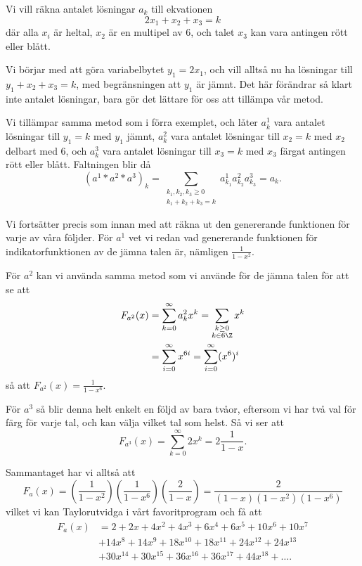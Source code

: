 \documentclass[nobib]{tufte-handout}
\begin{document}
\begin{example}
  Vi vill räkna antalet lösningar $a_k$ till ekvationen
  $$2x_1 + x_2 + x_3 = k$$
  där alla $x_i$ är heltal, $x_2$ är en multipel av $6$, och talet $x_3$ kan vara antingen rött eller blått.

  Vi börjar med att göra variabelbytet $y_1 = 2x_1$, och vill alltså nu ha lösningar till $y_1 + x_2 + x_3 = k$, med begränsningen att $y_1$ är jämnt. Det här förändrar så klart inte antalet lösningar, bara gör det lättare för oss att tillämpa vår metod.

  Vi tillämpar samma metod som i förra exemplet, och låter $a^1_k$ vara antalet lösningar till $y_1 = k$ med $y_1$ jämnt, $a^2_k$ vara antalet lösningar till $x_2 = k$ med $x_2$ delbart med $6$, och $a^3_k$ vara antalet lösningar till $x_3 = k$ med $x_3$ färgat antingen rött eller blått. Faltningen blir då 
  $$(a^1 * a^2 * a^3)_k = \sum_{\substack{k_1, k_2, k_3 \geq 0\\k_1+k_2+k_3 = k}} a^1_{k_1}a^2_{k_2}a^3_{k_3} = a_k.$$

  Vi fortsätter precis som innan med att räkna ut den genererande funktionen för varje av våra följder. För $a^1$ vet vi redan vad genererande funktionen för indikatorfunktionen av de jämna talen är, nämligen $\frac{1}{1-x^2}$. 
  
  För $a^2$ kan vi använda samma metod som vi använde för de jämna talen för att se att
  \begin{align*}
    F_{a^2}(x) &= \sum_{k=0}^{\infty} a^2_k x^k = \sum_{\substack{k \geq 0\\k \in 6\Z}} x^k\\
    &= \sum_{i=0}^{\infty} x^{6i} = \sum_{i=0}^{\infty} (x^6)^i
  \end{align*}
  så att $F_{a^2}(x) = \frac{1}{1-x^6}$.

  För $a^3$ så blir denna helt enkelt en följd av bara tvåor, eftersom vi har två val för färg för varje tal, och kan välja vilket tal som helst. Så vi ser att
  $$F_{a^3}(x) = \sum_{k=0}^{\infty} 2x^k = 2\frac{1}{1-x}.$$

  Sammantaget har vi alltså att
  $$F_a(x) = \left(\frac{1}{1-x^2}\right)\left(\frac{1}{1-x^6}\right)\left(\frac{2}{1-x}\right) = \frac{2}{(1-x)(1-x^2)(1-x^6)}$$
  vilket vi kan Taylorutvidga i vårt favoritprogram och få att
  \begin{align*}
    F_a(x) &= 2 + 2 x + 4 x^2 + 4 x^3 + 6 x^4 + 6 x^5 + 10 x^6 + 10 x^7\\
    & + 14 x^8 + 14 x^9 + 18 x^{10} + 18 x^{11} + 24 x^{12} + 24 x^{13}\\
    & + 30 x^{14} + 30 x^{15} + 36 x^{16} + 36 x^{17} + 44 x^{18} + \ldots.
  \end{align*}
\end{example}
\end{document}
